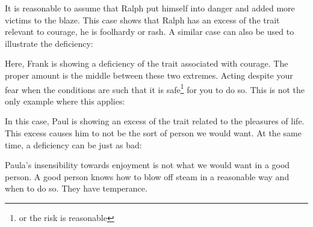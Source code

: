 It is reasonable to assume that Ralph put himself into danger and added more victims to the blaze. This case shows that Ralph has an excess of the trait relevant to courage, he is foolhardy or rash. A similar case can also be used to illustrate the deficiency: 


Here, Frank is showing a deficiency of the trait associated with courage. The proper amount is the middle between these two extremes. Acting despite your fear when the conditions are such that it is safe\footnote{or the risk is reasonable} for you to do so. This is not the only example where this applies: 


In this case, Paul is showing an excess of the trait related to the pleasures of life. This excess causes him to not be the sort of person we would want. At the same time, a deficiency can be just as bad: 


Paula's insensibility towards enjoyment is not what we would want in a good person. A good person knows how to blow off steam in a reasonable way and when to do so. They have temperance.

